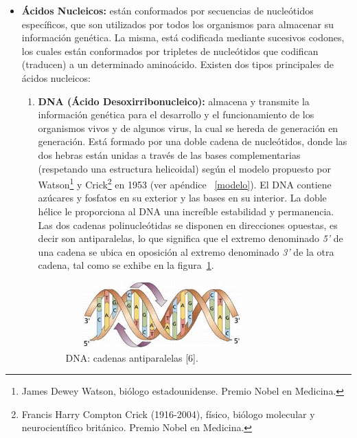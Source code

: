 \begin{itemize}
	\item \textbf{Ácidos Nucleicos:} están conformados por secuencias de nucleótidos específicos, que son
    utilizados por todos los organismos para almacenar su información genética. La misma, está codificada
    mediante sucesivos codones, los cuales están conformados por tripletes de nucleótidos que codifican (traducen) a un determinado aminoácido. Existen dos tipos principales de ácidos nucleicos:
    	\begin{enumerate}
			\item \textbf{DNA (Ácido Desoxirribonucleico):} almacena y transmite la información    
			genética para el desarrollo y el funcionamiento de los organismos vivos y de algunos virus, la cual se hereda de generación en generación. Está formado por una doble cadena de nucleótidos, donde las dos hebras están unidas a través de las bases complementarias (respetando una estructura helicoidal) según el modelo propuesto por Watson\footnote{James Dewey Watson, biólogo estadounidense. Premio Nobel en Medicina.} y Crick\footnote{Francis Harry Compton Crick (1916-2004), físico, biólogo molecular y  neurocientífico británico. Premio Nobel en Medicina.} en 1953 (ver apéndice ~\ref{modelo}). El DNA contiene azúcares y fosfatos en su exterior y las bases en su interior. 
    		La doble hélice le proporciona al DNA una increíble estabilidad y permanencia. Las dos cadenas polinucleótidas se disponen en direcciones opuestas, es decir son antiparalelas, lo que significa que el extremo denominado \emph{5'} de una cadena se ubica en oposición al extremo denominado \emph{3'} de la otra cadena, tal como se exhibe en la figura~\ref{extremos}.

    		\begin{figure} [h]
				\begin{center}
					\includegraphics[width=2.9209in,height=1.0000in]{image/extremos.jpg}
					\caption{DNA: cadenas antiparalelas [6].}				
					\label{extremos}
				\end{center}
			\end{figure}	


\end{enumerate}
\end{itemize}
